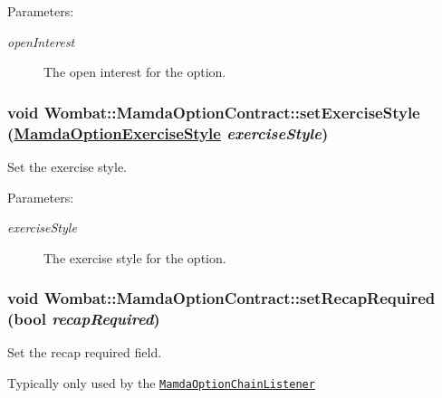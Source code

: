 \begin{Desc}
\item[Parameters:]
\begin{description}
\item[{\em open\-Interest}]The open interest for the option. \end{description}
\end{Desc}
\hypertarget{classWombat_1_1MamdaOptionContract_f6f42f64ca7004717761c6d4bc09932a}{
\subsubsection[setExerciseStyle]{\setlength{\rightskip}{0pt plus 5cm}void Wombat::Mamda\-Option\-Contract::set\-Exercise\-Style (\hyperlink{namespaceWombat_e7be5722df9d72164d322f2b72cf8d1a}{Mamda\-Option\-Exercise\-Style} {\em exercise\-Style})}}
\label{classWombat_1_1MamdaOptionContract_f6f42f64ca7004717761c6d4bc09932a}


Set the exercise style. 

\begin{Desc}
\item[Parameters:]
\begin{description}
\item[{\em exercise\-Style}]The exercise style for the option. \end{description}
\end{Desc}
\hypertarget{classWombat_1_1MamdaOptionContract_d2685768085c33dd51dc71c65b4804fa}{
\subsubsection[setRecapRequired]{\setlength{\rightskip}{0pt plus 5cm}void Wombat::Mamda\-Option\-Contract::set\-Recap\-Required (bool {\em recap\-Required})}}
\label{classWombat_1_1MamdaOptionContract_d2685768085c33dd51dc71c65b4804fa}


Set the recap required field. 

Typically only used by the {\tt \hyperlink{classWombat_1_1MamdaOptionChainListener}{Mamda\-Option\-Chain\-Listener}}

